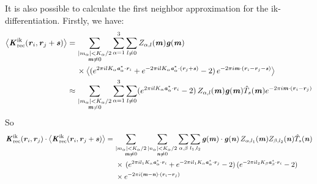 \documentclass[aps,pre,preprint]{revtex4}
\renewcommand{\v}[1]{\textbf{\textit{#1}}}
\begin{document}
It is also possible to calculate the first neighbor approximation for the
ik-differentiation. Firstly, we have:
\begin{align}\nonumber
  \big\langle
  \v K^{\textrm{ik}}_{\textrm{rec}}(\v r_i, \v r_j+\v s)
  \big\rangle
  = \,&
  \sum_{
    \begin{subarray}{c}
      \vert m_{\alpha}\vert < K_\alpha/2\\
      \v m\neq 0
    \end{subarray}}
  \sum_{\alpha=1}^3\sum_{l\neq 0}
  Z_{\alpha,l}(\v m)
  \v g(\v m) \\ \nonumber
  \,&
  \times
  \big\langle
  (
  e^{2\pi i l K_\alpha\v a^\ast_\alpha\cdot \v r_i} +
  e^{-2\pi i l K_\alpha\v a^\ast_\alpha\cdot (\v r_j + \v s)}
  - 2
  )\,
  e^{-2\pi i\v m\cdot(\v r_i-\v r_j -\v s)}
  \big\rangle \\
  \approx\,&
  \sum_{
    \begin{subarray}{c}
      \vert m_{\alpha}\vert < K_\alpha/2\\
      \v m\neq 0
    \end{subarray}}
  \sum_{\alpha=1}^3\sum_{l\neq 0}
  (
  e^{2\pi i l K_\alpha\v a^\ast_\alpha\cdot \v r_i} 
  - 2
  )\,
  Z_{\alpha,l}(\v m)
  \v g(\v m)
  \hat T_s(\v m)
  e^{-2\pi i\v m\cdot(\v r_i-\v r_j)}  
\end{align}
So
\begin{align}\nonumber
  \v K^{\textrm{ik}}_{\textrm{rec}}(\v r_i,\v r_j)\cdot
  \big\langle
  \v K^{\textrm{ik}}_{\textrm{rec}}(\v r_i, \v r_j+\v s)
  \big\rangle
  =\,&
  \sum_{
    \begin{subarray}{c}
      \vert m_{\alpha}\vert < K_\alpha/2\\
      \v m\neq 0
    \end{subarray}}
  \sum_{
    \begin{subarray}{c}
      \vert n_{\alpha}\vert < K_\alpha/2\\
      \v n\neq 0
    \end{subarray}}
  \sum_{\alpha,\beta}
  \sum_{l_1,l_2}
  \v g(\v m)\cdot\v g(\v n)\,
  Z_{\alpha,l_1}(\v m)Z_{\beta,l_2}(\v n)\hat T_s(\v n)
  \\\nonumber
  &\,
  \times
  \,(
  e^{2\pi i l_1 K_\alpha\v a^\ast_\alpha\cdot \v r_i} +
  e^{-2\pi i l_1 K_\alpha\v a^\ast_\alpha\cdot \v r_j}
  - 2
  )
  \,(
  e^{-2\pi i l_2 K_\beta\v a^\ast_\beta\cdot \v r_i}
  - 2
  )\\
  &\,
  \times
  e^{-2\pi i(\v m-\v n)\cdot(\v r_i-\v r_j)}
\end{align}
\end{document}
